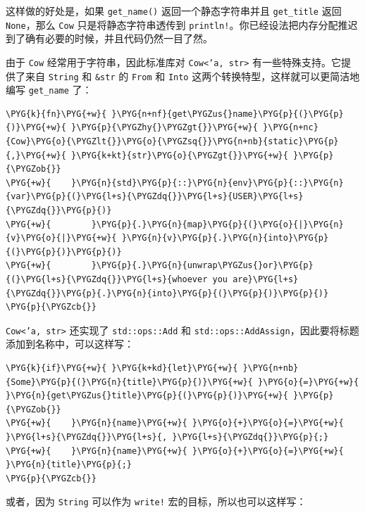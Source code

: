 这样做的好处是，如果 \texttt{get\_name()} 返回一个静态字符串并且 \texttt{get\_title} 返回 \texttt{None}，那么 \texttt{Cow} 只是将静态字符串透传到 \texttt{println!}。你已经设法把内存分配推迟到了确有必要的时候，并且代码仍然一目了然。

由于 \texttt{Cow} 经常用于字符串，因此标准库对 \texttt{Cow<'a, str>} 有一些特殊支持。它提供了来自 \texttt{String} 和 \texttt{\&str} 的 \texttt{From} 和 \texttt{Into} 这两个转换特型，这样就可以更简洁地编写 \texttt{get\_name} 了：

\begin{Verbatim}[commandchars=\\\{\},breaklines=true,breakanywhere=true,fontsize=\codefont,xleftmargin=17bp]
\PYG{k}{fn}\PYG{+w}{ }\PYG{n+nf}{get\PYGZus{}name}\PYG{p}{(}\PYG{p}{)}\PYG{+w}{ }\PYG{p}{\PYGZhy{}\PYGZgt{}}\PYG{+w}{ }\PYG{n+nc}{Cow}\PYG{o}{\PYGZlt{}}\PYG{o}{\PYGZsq{}}\PYG{n+nb}{static}\PYG{p}{,}\PYG{+w}{ }\PYG{k+kt}{str}\PYG{o}{\PYGZgt{}}\PYG{+w}{ }\PYG{p}{\PYGZob{}}
\PYG{+w}{    }\PYG{n}{std}\PYG{p}{::}\PYG{n}{env}\PYG{p}{::}\PYG{n}{var}\PYG{p}{(}\PYG{l+s}{\PYGZdq{}}\PYG{l+s}{USER}\PYG{l+s}{\PYGZdq{}}\PYG{p}{)}
\PYG{+w}{        }\PYG{p}{.}\PYG{n}{map}\PYG{p}{(}\PYG{o}{|}\PYG{n}{v}\PYG{o}{|}\PYG{+w}{ }\PYG{n}{v}\PYG{p}{.}\PYG{n}{into}\PYG{p}{(}\PYG{p}{)}\PYG{p}{)}
\PYG{+w}{        }\PYG{p}{.}\PYG{n}{unwrap\PYGZus{}or}\PYG{p}{(}\PYG{l+s}{\PYGZdq{}}\PYG{l+s}{whoever you are}\PYG{l+s}{\PYGZdq{}}\PYG{p}{.}\PYG{n}{into}\PYG{p}{(}\PYG{p}{)}\PYG{p}{)}
\PYG{p}{\PYGZcb{}}
\end{Verbatim}

\texttt{Cow<'a, str>} 还实现了 \texttt{std::ops::Add} 和 \texttt{std::ops::AddAssign}，因此要将标题添加到名称中，可以这样写：

\begin{Verbatim}[commandchars=\\\{\},breaklines=true,breakanywhere=true,fontsize=\codefont,xleftmargin=17bp]
\PYG{k}{if}\PYG{+w}{ }\PYG{k+kd}{let}\PYG{+w}{ }\PYG{n+nb}{Some}\PYG{p}{(}\PYG{n}{title}\PYG{p}{)}\PYG{+w}{ }\PYG{o}{=}\PYG{+w}{ }\PYG{n}{get\PYGZus{}title}\PYG{p}{(}\PYG{p}{)}\PYG{+w}{ }\PYG{p}{\PYGZob{}}
\PYG{+w}{    }\PYG{n}{name}\PYG{+w}{ }\PYG{o}{+}\PYG{o}{=}\PYG{+w}{ }\PYG{l+s}{\PYGZdq{}}\PYG{l+s}{, }\PYG{l+s}{\PYGZdq{}}\PYG{p}{;}
\PYG{+w}{    }\PYG{n}{name}\PYG{+w}{ }\PYG{o}{+}\PYG{o}{=}\PYG{+w}{ }\PYG{n}{title}\PYG{p}{;}
\PYG{p}{\PYGZcb{}}
\end{Verbatim}

或者，因为 \texttt{String} 可以作为 \texttt{write!} 宏的目标，所以也可以这样写：

